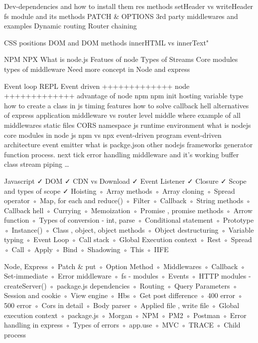 Dev-dependencies and how to install them
res methods
setHeader vs writeHeader
fs module and its methods
PATCH & OPTIONS
3rd party middlewares and examples
Dynamic routing
Router chaining

CSS positions
DOM and DOM methods
innerHTML vs innerText"

NPM
NPX
What is node.js
Featues of node
Types of Streams
Core modules
types of middleware
Need more concept in Node and express

Event loop
REPL
Event driven
+++++++++++++
node
+++++++++++++
advantage of node 
npm 
npm init 
hosting 
variable type 
how to create a class in js 
timing features 
how to solve callback hell 
alternatives of express 
application middleware vs router level middle where 
example of all middlewares
static files 
CORS 
namespace js 
runtime environment 
what is nodejs 
core modules in node js 
npm vs npx
event-driven program 
event-driven architecture
event emitter 
what is packge.json 
other nodejs frameworks
generator function 
process. next tick 
error handling middleware and it's working 
buffer class
stream 
piping 
…

Javascript
 ✓ DOM
 ✓ CDN vs Download
 ✓ Event Listener
 ✓ Closure
 ✓ Scope and types of scope
 ✓ Hoisting
 ◦ Array methods
 ◦ Array cloning
 ◦ Spread operator
 ◦ Map, for each and reduce()
 ◦ Filter 
 ◦ Callback
 ◦ String methods
 ◦ Callback hell
 ◦ Currying
 ◦ Memoization
 ◦ Promise , promise methods
 ◦ Arrow function
 ◦ Types of conversion - int, parse
 ◦ Conditional statement
 ◦ Prototype
 ◦ Instance()
 ◦ Class , object, object methods
 ◦ Object destructuring
 ◦ Variable typing
 ◦ Event Loop
 ◦ Call stack
 ◦ Global Execution context
 ◦ Rest 
 ◦ Spread 
 ◦ Call 
 ◦ Apply 
 ◦ Bind
 ◦ Shadowing
 ◦ This
 ◦ IIFE

Node, Express
 ◦ Patch & put
 ◦ Option Method
 ◦ Middlewares
 ◦ Callback
 ◦ Set-immediate
 ◦ Error middleware
 ◦ fs - modules
 ◦ Events
 ◦ HTTP modules - createServer()
 ◦ package.js dependencies
 ◦ Routing
 ◦ Query Parameters
 ◦ Session and cookie
 ◦ View engine
 ◦ Hbs
 ◦ Get post difference
 ◦ 400 error
 ◦ 500 error
 ◦ Cors in detail
 ◦ Body parser
 ◦ Applied file , write file
 ◦ Global execution context
 ◦ package.js
 ◦ Morgan
 ◦ NPM
 ◦ PM2
 ◦ Postman
 ◦ Error handling in express
 ◦ Types of errors
 ◦ app.use
 ◦ MVC
 ◦ TRACE
 ◦ Child process

